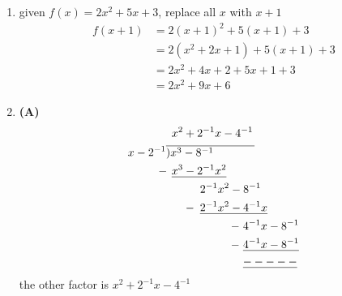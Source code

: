 \begin{multicols}{2}
\begin{enumerate}[label={\textbf{\arabic*.}}]
    \item given $f(x) = 2x^2 + 5x + 3$, replace all $x$ with $x + 1$ 
     \begin{align*}
        f(x + 1) &= 2(x + 1)^2+ 5(x +1) + 3 \\
        & = 2(x^2 + 2x + 1) + 5(x + 1) + 3 \\
        & = 2x^2 + 4x + 2 + 5x + 1 + 3 \\
        & = 2x^2 + 9x + 6
     \end{align*}

    \item \textbf{(A)} \begin{align*} 
        & \hspace{5pt} x^ 2 + 2^{-1}x -4^{-1} \\ \vspace{-20pt} 
        x - 2^{-1}& \overline{)x^3 - 8^{-1} \hspace{.5in}} \\
        -\hspace{-1pt} & \hspace{5pt} \underline{x^3 - 2^{-1}x^2} \\
        & \hspace{30pt} 2^{-1}x^2 - 8^{-1} \\
        -\hspace{-25pt} & \hspace{30pt} \underline{2^{-1}x^2 - 4^{-1}x} \\
       -\hspace{-65pt} & \hspace{68pt} 4^{-1}x - 8^{-1} \\
       -\hspace{-65pt} & \hspace{68pt} \underline{4^{-1}x - 8^{-1} } \\
       & \hspace{68pt} \underline{-----} 
    \end{align*}
    the other factor is $x^ 2 + 2^{-1}x -4^{-1}$


\end{enumerate}
\end{multicols}
